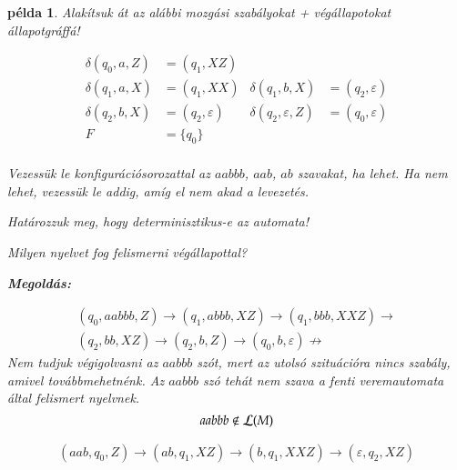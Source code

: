 \documentclass[a4paper]{article}
\newtheorem{pelda}{példa}[section]
\begin{document}
\begin{pelda}
Alakítsuk át az alábbi mozgási szabályokat + végállapotokat állapotgráffá!

\begin{align*}
\delta(q_0, a, Z) &= (q_1, XZ)\\
\delta(q_1, a, X) &= (q_1, XX)&
\delta(q_1, b, X) &= (q_2, \varepsilon)\\
\delta(q_2, b, X) &= (q_2, \varepsilon)&
\delta(q_2, \varepsilon, Z) &= (q_0, \varepsilon)\\
F &= \{q_0\}&&\\
\end{align*}

Vezessük le konfigurációsorozattal az $aabbb$,
$aab$, $ab$ szavakat, ha lehet. Ha nem lehet, vezessük le addig, amíg el
nem akad a levezetés.

Határozzuk meg, hogy determinisztikus-e az automata!

Milyen nyelvet fog felismerni végállapottal?

\textbf{Megoldás:}


\begin{gather*}
(q_0, aabbb, Z) \to (q_1,abbb,XZ) \to (q_1,bbb,XXZ)\to\\
(q_2,bb,XZ) \to (q_2,b,Z) \to (q_0,b,\varepsilon) \not \to
\end{gather*}
Nem tudjuk végigolvasni az $aabbb$ szót, mert az utolsó szituációra nincs
szabály, amivel továbbmehetnénk. Az $aabbb$ szó tehát nem szava a fenti
veremautomata által felismert nyelvnek.
\[aabbb \notin {\cal L} (M)\]

\begin{gather*}
(aab, q_0, Z) \to (ab,q_1,XZ) \to (b,q_1,XXZ)\to
(\varepsilon,q_2,XZ)
\end{gather*}


\end{pelda}
\end{document}
